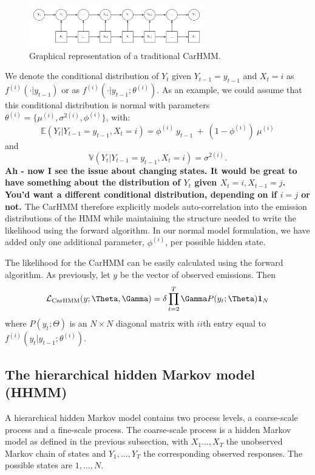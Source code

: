 \begin{figure}[ht]
	\centering
	\includegraphics[width=3in]{../Plots/CarHMM.png}
	\caption{Graphical representation of a traditional CarHMM.}
	\label{fig:CarHMM}
\end{figure}

%
We denote the conditional distribution of $Y_t$ given $Y_{t-1}= y_{t-1}$ and $ X_t=i$ as $f^{(i)}( \cdot | y_{t-1})$ or as
$f^{(i)}( \cdot | y_{t-1}; \theta^{(i)})$.
As an example, we could assume that this conditional distribution is normal with parameters $\theta^{(i)} = \{\mu^{(i)},\sigma^{2(i)},\phi^{(i)}\}$, with:
%
\[
\mathbb{E}(Y_t|Y_{t-1} = y_{t-1},X_t=i) = \phi^{(i)} ~ y_{t-1} ~+ ~(1-\phi^{(i)})  ~\mu^{(i)}
\]
and
\[
\mathbb{V}(Y_t| Y_{t-1} =y_{t-1}, X_t = i) = \sigma^{2(i)}.
\]
%
{\bf{Ah - now I see the issue about changing states.  It would be great to have something about the distribution of $Y_t$ given $X_t=i, X_{t-1}=j$. You'd want a different conditional distribution, depending on if $i=j$ or not.
}}
%
The CarHMM therefore explicitly models auto-correlation into the emission distributions of the HMM while maintaining the structure needed to write the likelihood using the forward algorithm. In our normal model formulation, we have added only one additional parameter, $\phi^{(i)}$,  per possible hidden state. 

The likelihood for the CarHMM can be easily calculated using the forward algorithm.  As previously, let $y$ be the vector of observed emissions.  Then
\begin{equation}
\calL_{\text{CarHMM}}(y;\Theta,\Gamma) = \delta \prod_{t=2}^T \Gamma P(y_t;\Theta) \mathbf{1}_N
\label{CarHMM_likelihood}
\end{equation}
where
%
$P(y_t;\Theta)$ is an $N \times N$ diagonal matrix with $ii$th entry equal to $f^{(i)}(y_t|y_{t-1}; \theta^{(i)})$.
%

\subsection{The hierarchical hidden Markov model (HHMM)}

A hierarchical hidden Markov model contains two process levels, a coarse-scale process and a fine-scale process.  The coarse-scale process is a hidden Markov model as defined in the previous subsection,  with  $X_1\ldots, X_T$ the unobserved Markov chain of states and $Y_1,\ldots, Y_T$ the corresponding observed responses.  The possible states are $1,\ldots, N$.   
%

